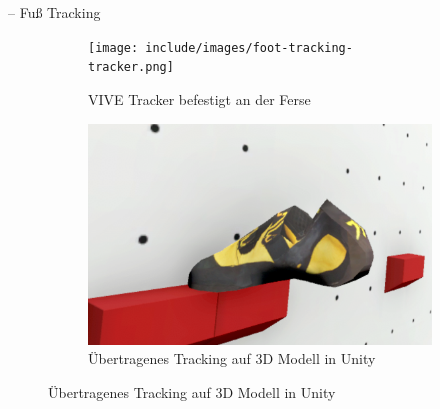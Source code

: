 \begin{frame}{\currentname{} -- Fuß Tracking}
\begin{figure}
	\centering
	\begin{subfigure}[t]{0.49\textwidth}
		\centering
		\texttt{[image: include/images/foot-tracking-tracker.png]}
		\caption{VIVE Tracker befestigt an der Ferse}
		\label{fig:foot-tracking-tracker}
	\end{subfigure}
	\hfill
	\begin{subfigure}[t]{0.49\textwidth}  
		\centering 
		\includegraphics[width=\textwidth]{include/images/foot-tracking-result.png}
		\caption{Übertragenes Tracking auf 3D Modell in Unity}
		\label{fig:foot-tracking-result}
	\end{subfigure}
	\label{fig:foot-tracking}
\end{figure}
\end{frame}

